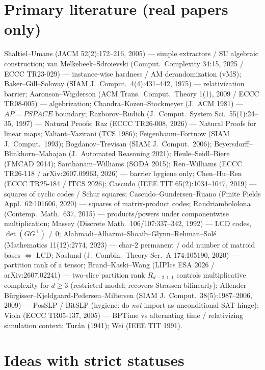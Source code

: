 \documentclass[11pt]{article}
\begin{document}
\section*{Primary literature (real papers only)}
Shaltiel--Umans (JACM 52(2):172--216, 2005) --- simple extractors / SU algebraic
construction;
van Melkebeek--Sdroievski (Comput.\ Complexity 34:15, 2025 / ECCC TR23-029) ---
instance-wise hardness / AM derandomization (vMS);
Baker--Gill--Solovay (SIAM J.\ Comput.\ 4(4):431--442, 1975) --- relativization
barrier;
Aaronson--Wigderson (ACM Trans.\ Comput.\ Theory 1(1), 2009 / ECCC TR08-005) ---
algebrization;
Chandra--Kozen--Stockmeyer (J.\ ACM 1981) --- $AP=PSPACE$ boundary;
Razborov--Rudich (J.\ Comput.\ System Sci.\ 55(1):24--35, 1997) --- Natural Proofs;
Raz (ECCC TR26-008, 2026) --- Natural Proofs for linear maps;
Valiant--Vazirani (TCS 1986); Feigenbaum--Fortnow (SIAM J.\ Comput.\ 1993);
Bogdanov--Trevisan (SIAM J.\ Comput.\ 2006);
Beyersdorff--Blinkhorn--Mahajan (J.\ Automated Reasoning 2021);
Heule--Seidl--Biere (FMCAD 2014); Santhanam--Williams (SODA 2015);
Ren--Williams (ECCC TR26-118 / arXiv:2607.09963, 2026) --- barrier hygiene only;
Chen--Hu--Ren (ECCC TR25-184 / ITCS 2026); Cascudo (IEEE TIT 65(2):1034--1047,
2019) --- squares of cyclic codes / Schur squares;
Cascudo--Gundersen--Ruano (Finite Fields Appl.\ 62:101606, 2020) --- squares of
matrix-product codes;
Randriambololona (Contemp.\ Math.\ 637, 2015) --- products/powers under
componentwise multiplication;
Massey (Discrete Math.\ 106/107:337--342, 1992) --- LCD codes,
$\det(GG^\top)\neq 0$;
Alahmadi--Alhazmi--Shoaib--Glynn--Rehman--Sol\'e (Mathematics 11(12):2774, 2023)
--- char-$2$ permanent / odd number of matroid bases $\Leftrightarrow$ LCD;
Naslund (J.\ Combin.\ Theory Ser.\ A 174:105190, 2020) --- partition rank of a
tensor;
Brand--Kaski--Wang (LIPIcs ESA 2026 / arXiv:2607.02241) --- two-slice partition
rank $R_{d-2,1,1}$ controls multiplicative complexity for $d\ge 3$ (restricted
model; recovers Strassen bilinearly);
Allender--B\"urgisser--Kjeldgaard-Pedersen--Miltersen (SIAM J.\ Comput.\
38(5):1987--2006, 2009) --- PosSLP / BitSLP (hygiene: do \emph{not} import as
unconditional SAT hinge);
Viola (ECCC TR05-137, 2005) --- BPTime vs alternating time / relativizing
simulation context;
Tur\'an (1941); Wei (IEEE TIT 1991).

\section*{Ideas with strict statuses}
\end{document}
